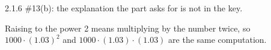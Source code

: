 \begin{sol}
 


 


\begin{corr}{2.1.6 \#13(b): the explanation the part asks for is not in the key.}%
\end{corr}

Raising to the power 2 means multiplying by the number twice, so $1000\cdot(1.03)^2$ and $1000\cdot(1.03)\cdot(1.03)$ are the same computation.

 


 



\end{sol}
